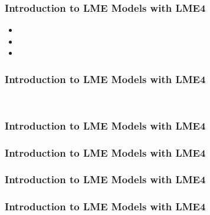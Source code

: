
\begin{frame}[fragile]
\frametitle{Introduction to LME Models with LME4} 
\Large

\begin{itemize}

\item

\item

\item

\end{itemize}


\end{frame}
\begin{frame}[fragile]
\frametitle{Introduction to LME Models with LME4} 
\Large

\begin{framed}
\begin{verbatim}


\end{verbatim}
\end{framed}

\end{frame}
\begin{frame}[fragile]
\frametitle{Introduction to LME Models with LME4} 
\Large

\end{frame}
\begin{frame}[fragile]
\frametitle{Introduction to LME Models with LME4} 
\Large


\end{frame}
\begin{frame}[fragile]
\frametitle{Introduction to LME Models with LME4} 
\Large

\end{frame}
\begin{frame}[fragile]
\frametitle{Introduction to LME Models with LME4} 
\Large

\end{frame}
